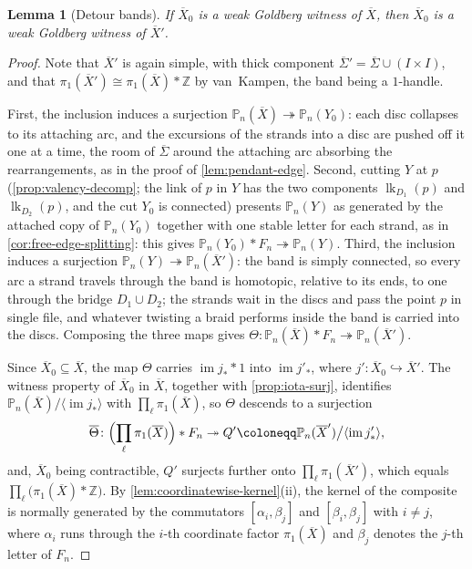 \documentclass[reqno]{amsart}
\newtheorem{lemma}[theorem]{Lemma}
\theoremstyle{definition}
\newcommand{\PB}{\mathbb{P}}
\newcommand{\im}{\operatorname{im}}
\newcommand{\Z}{\mathbb{Z}}
\newcommand{\co}[1]{\mathopen{\langle}#1\mathclose{\rangle}} %
\renewcommand{\bar}{\overline}
\DeclareMathOperator{\lk}{lk}
\numberwithin{equation}{section}
\begin{document}
\begin{lemma}[Detour bands]\label{lem:detour}
If \(\bar X_0\) is a weak Goldberg
witness of \(\bar X\), then \(\bar X_0\) is a weak Goldberg
witness of \(\bar X'\).
\end{lemma}
\begin{proof}
Note that \(\bar X'\) is again simple, with thick component
\(\bar\Sigma'=\bar\Sigma\cup(I\times I)\), and that
\(\pi_1(\bar X')\cong\pi_1(\bar X)\ast\Z\) by van~Kampen, the
band being a \(1\)-handle.

First, the inclusion induces a surjection
\(\PB_n(\bar X)\twoheadrightarrow\PB_n(Y_0)\): each disc
collapses to its attaching arc, and the excursions of the
strands into a disc are pushed off it one at a time, the
room of \(\bar\Sigma\) around the attaching arc absorbing the
rearrangements, as in the proof of \cref{lem:pendant-edge}.
Second, cutting \(Y\) at \(p\) (\cref{prop:valency-decomp};
the link of \(p\) in \(Y\) has the two components
\(\lk_{D_1}(p)\) and \(\lk_{D_2}(p)\), and the cut \(Y_0\) is
connected) presents \(\PB_n(Y)\) as generated by the attached
copy of \(\PB_n(Y_0)\) together with one stable letter for
each strand, as in \cref{cor:free-edge-splitting}: this gives
\(\PB_n(Y_0)\ast F_n\twoheadrightarrow\PB_n(Y)\). Third, the
inclusion induces a surjection
\(\PB_n(Y)\twoheadrightarrow\PB_n(\bar X')\): the band is
simply connected, so every arc a strand travels through the
band is homotopic, relative to its ends, to one through the
bridge \(D_1\cup D_2\); the strands wait in the discs and pass
the point \(p\) in single file, and whatever twisting a braid
performs inside the band is carried into the discs. Composing
the three maps gives \(\Theta\colon\PB_n(\bar X)\ast F_n\twoheadrightarrow
\PB_n(\bar X')\).

Since \(\bar X_0\subseteq\bar X\), the map
\(\Theta\) carries \(\im j_\ast\ast1\) into \(\im j'_\ast\),
where \(j'\colon\bar X_0\hookrightarrow\bar X'\). The witness
property of \(\bar X_0\) in \(\bar X\), together with
\cref{prop:iota-surj}, identifies
\(\PB_n(\bar X)/\co{\im j_\ast}\) with
\(\prod_\ell\pi_1(\bar X)\), so \(\Theta\) descends to a
surjection
\[
\bar\Theta\colon
\Bigl(\prod_\ell\pi_1(\bar X)\Bigr)\ast F_n
\twoheadrightarrow
Q'\coloneqq\PB_n(\bar X')\big/\co{\im j'_\ast},
\]
and, \(\bar X_0\) being contractible, \(Q'\) surjects
further onto \(\prod_\ell\pi_1(\bar X')\), which equals
\(\prod_\ell\bigl(\pi_1(\bar X)\ast\Z\bigr)\). By
\cref{lem:coordinatewise-kernel}(ii), the kernel of the
composite is normally generated by the commutators
\([\alpha_i,\beta_j]\) and \([\beta_i,\beta_j]\) with
\(i\neq j\), where \(\alpha_i\) runs through the \(i\)-th
coordinate factor \(\pi_1(\bar X)\) and \(\beta_j\) denotes
the \(j\)-th letter of \(F_n\).


\end{proof}
\end{document}
